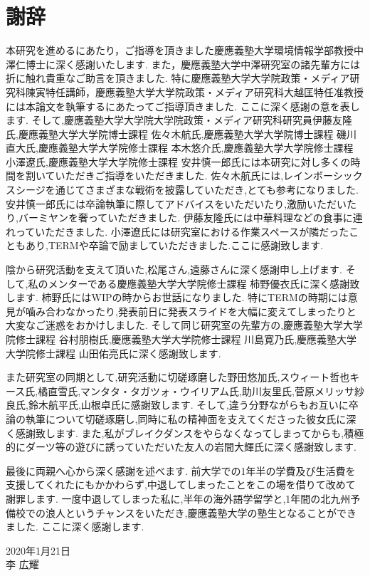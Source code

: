 \chapter*{謝辞}
本研究を進めるにあたり，ご指導を頂きました慶應義塾大学環境情報学部教授中澤仁博士に深く感謝いたします.
また，慶應義塾大学中澤研究室の諸先輩方には折に触れ貴重なご助言を頂きました.
特に慶應義塾大学大学院政策・メディア研究科陳寅特任講師，慶應義塾大学大学院政策・メディア研究科大越匡特任准教授には本論文を執筆するにあたってご指導頂きました.
ここに深く感謝の意を表します.
そして,慶應義塾大学大学院大学院政策・メディア研究科研究員伊藤友隆氏,慶應義塾大学大学院博士課程 佐々木航氏,慶應義塾大学大学院博士課程 磯川直大氏,慶應義塾大学大学院修士課程 本木悠介氏,慶應義塾大学大学院修士課程 小澤遼氏,慶應義塾大学大学院修士課程 安井慎一郎氏には本研究に対し多くの時間を割いていただきご指導をいただきました.
佐々木航氏には,レインボーシックスシージを通じてさまざまな戦術を披露していただき,とても参考になりました.
安井慎一郎氏には卒論執筆に際してアドバイスをいただいたり,激励いただいたり,バーミヤンを奢っていただきました.
伊藤友隆氏には中華料理などの食事に連れっていただきました.
小澤遼氏には研究室における作業スペースが隣だったこともあり,TERMや卒論で励ましていただきました.ここに感謝致します.

陰から研究活動を支えて頂いた,松尾さん,遠藤さんに深く感謝申し上げます.
そして,私のメンターである慶應義塾大学大学院修士課程 柿野優衣氏に深く感謝致します.
柿野氏にはWIPの時からお世話になりました.
特にTERMの時期には意見が噛み合わなかったり,発表前日に発表スライドを大幅に変えてしまったりと大変なご迷惑をおかけしました.
そして同じ研究室の先輩方の,慶應義塾大学大学院修士課程 谷村朋樹氏,慶應義塾大学大学院修士課程 川島寛乃氏,慶應義塾大学大学院修士課程 山田佑亮氏に深く感謝致します.

また研究室の同期として,研究活動に切磋琢磨した野田悠加氏,スウィート哲也キース氏,橘直雪氏,マンタタ・タガツォ・ウイリアム氏,助川友里氏,菅原メリッサ紗良氏,鈴木航平氏,山根卓氏に感謝致します.
そして,違う分野ながらもお互いに卒論の執筆について切磋琢磨し,同時に私の精神面を支えてくださった彼女氏に深く感謝致します.
また,私がブレイクダンスをやらなくなってしまってからも,積極的にダーツ等の遊びに誘っていただいた友人の岩間大輝氏に深く感謝致します.

最後に両親へ心から深く感謝を述べます.
前大学での1年半の学費及び生活費を支援してくれたにもかかわらず,中退してしまったことをこの場を借りて改めて謝罪します.
一度中退してしまった私に,半年の海外語学留学と,1年間の北九州予備校での浪人というチャンスをいただき,慶應義塾大学の塾生となることができました.
ここに深く感謝します.

\begin{flushright}
2020年1月21日\\
李 広耀
\end{flushright}
